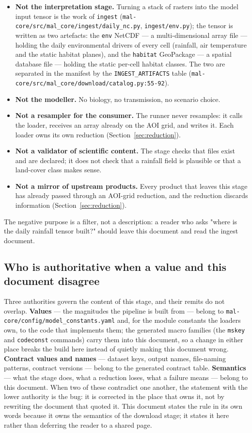 \documentclass[11pt,a4paper]{article}
\newcommand{\code}[1]{\texttt{#1}}
\begin{document}
\begin{itemize}
\item \textbf{Not the interpretation stage.} Turning a stack of rasters into
the model input tensor is the work of \code{ingest}
(\code{mal-core/src/mal\_core/ingest/daily\_nc.py}, \code{ingest/env.py});
the tensor is written as two artefacts: the \code{env} NetCDF --- a
multi-dimensional array file --- holding the daily environmental drivers of
every cell (rainfall, air temperature and the static habitat planes), and the
\code{habitat} GeoPackage --- a spatial database file --- holding the static
per-cell habitat classes. The
two are separated in the manifest by the \code{INGEST\_ARTIFACTS} table
(\code{mal-core/src/mal\_core/download/catalog.py:55-92}).
\item \textbf{Not the modeller.} No biology, no transmission, no scenario
choice.
\item \textbf{Not a resampler for the consumer.} The runner never resamples:
it calls the loader, receives an array already on the AOI grid, and writes it.
Each loader owns its own reduction (Section~\ref{sec:reduction}).
\item \textbf{Not a validator of scientific content.} The stage checks that
files exist and are declared; it does not check that a rainfall field is
plausible or that a land-cover class makes sense.
\item \textbf{Not a mirror of upstream products.} Every product that leaves
this stage has already passed through an AOI-grid reduction, and the reduction
discards information (Section~\ref{sec:reduction}).
\end{itemize}

The negative purpose is a filter, not a description: a reader who asks
"where is the daily rainfall tensor built?" should leave this document and read
the ingest document.

\subsection{Who is authoritative when a value and this document disagree}

Three authorities govern the content of this stage, and their remits do not
overlap. \textbf{Values} --- the magnitudes the pipeline is built from ---
belong to \code{mal-core/config/model\_constants.yaml} and, for the module
constants the loaders own, to the code that implements them; the generated
macro families (the \code{mskey} and \code{codeconst} commands) carry them
into this document, so a change in either place breaks the build here instead
of quietly making
this document wrong. \textbf{Contract values and names} --- dataset keys,
output names, file-naming patterns, contract versions --- belong to the
generated contract table. \textbf{Semantics} --- what the stage does, what a
reduction loses, what a failure means --- belong to this document. When two of
these contradict one another, the statement with the lower authority is the
bug: it is corrected in the place that owns it, not by rewriting the document
that quoted it. This document states the rule in its own words because it
owns the semantics of the download stage; it states it here rather than
deferring the reader to a shared page.
\end{document}
